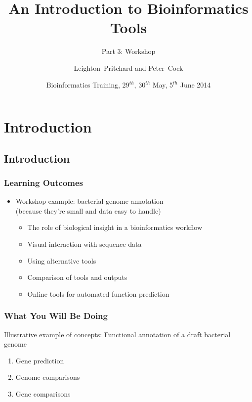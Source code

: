 
%



\title[Intro to Bioinformatics] %
{An Introduction to Bioinformatics Tools}
\subtitle{Part 3: Workshop}
\author[Pritchard, Cock] %
{Leighton~Pritchard and Peter~Cock}
\date[May, June 2014] %
{Bioinformatics Training, 29$^{th}$, 30$^{th}$ May, 5$^{th}$ June 2014}
\subject{Bioinformatics}





\frame[plain]{\titlepage}
 
\section{Introduction}
\subsection{Introduction}
\begin{frame}
  \frametitle{Learning Outcomes}
  \begin{itemize}
    \item Workshop example: bacterial genome annotation \\
             (because they're small and data easy to handle)
    \begin{itemize}
      \item The role of biological insight in a bioinformatics workflow
      \item Visual interaction with sequence data
      \item Using alternative tools
      \item Comparison of tools and outputs
      \item Online tools for automated function prediction
    \end{itemize}
  \end{itemize}
\end{frame} 
  
\begin{frame}
  \frametitle{What You Will Be Doing}
  Illustrative example of concepts: Functional annotation of a draft bacterial genome
  \begin{enumerate}
    \item Gene prediction
    \item Genome comparisons
    \item Gene comparisons
  \end{enumerate}
\end{frame}

